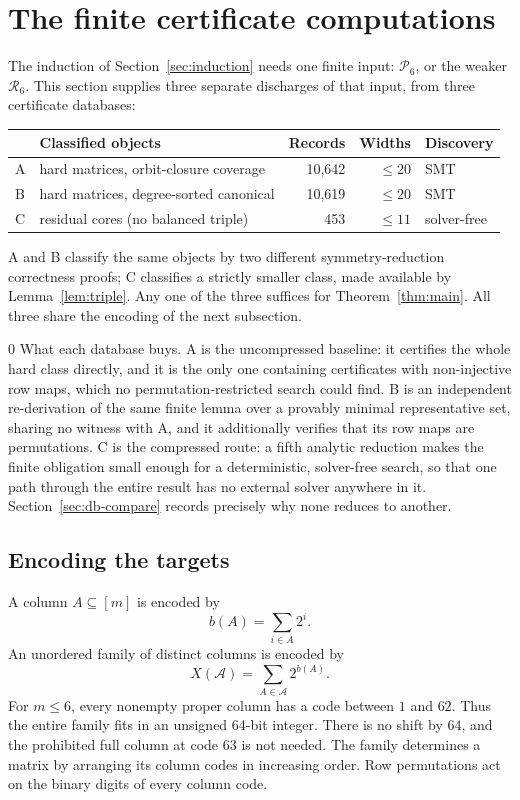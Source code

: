 \documentclass[11pt,letterpaper]{article}
\numberwithin{equation}{section}
\theoremstyle{definition}
\theoremstyle{remark}
\newcommand{\dbA}{\textsf{A}}
\newcommand{\dbB}{\textsf{B}}
\newcommand{\dbC}{\textsf{C}}
\begin{document}
\section{The finite certificate computations}
\label{sec:computation}
The induction of Section~\ref{sec:induction} needs one finite input:
$\mathcal P_6$, or the weaker $\mathcal R_6$. This section supplies three
separate discharges of that input, from three certificate databases:

\begin{center}
\begin{tabular}{llrrl}
\toprule
& Classified objects & Records & Widths & Discovery\\
\midrule
\dbA{} & hard matrices, orbit-closure coverage & 10,642 & $\le20$ & SMT\\
\dbB{} & hard matrices, degree-sorted canonical & 10,619 & $\le20$ & SMT\\
\dbC{} & residual cores (no balanced triple) & 453 & $\le11$ & solver-free\\
\bottomrule
\end{tabular}
\end{center}

\dbA{} and \dbB{} classify the same objects by two different
symmetry-reduction correctness proofs; \dbC{} classifies a strictly smaller
class, made available by Lemma~\ref{lem:triple}. Any one of the three
suffices for Theorem~\ref{thm:main}. All three share the encoding of the next
subsection.

\begin{variantbox}{0}
What each database buys. \dbA{} is the uncompressed baseline: it certifies the
whole hard class directly, and it is the only one containing certificates
with non-injective row maps, which no permutation-restricted search could
find. \dbB{} is an independent re-derivation of the same finite lemma over a
provably minimal representative set, sharing no witness with \dbA{}, and it
additionally verifies that its row maps are permutations. \dbC{} is the
compressed route: a fifth analytic reduction makes the finite obligation
small enough for a deterministic, solver-free search, so that one path
through the entire result has no external solver anywhere in it.
Section~\ref{sec:db-compare} records precisely why none reduces to another.
\end{variantbox}

\subsection{Encoding the targets}
A column $A\subseteq[m]$ is encoded by
\[
 b(A)=\sum_{i\in A}2^i.
\]
An unordered family of distinct columns is encoded by
\begin{equation}\label{eq:family-mask}
 X(\mathcal A)=\sum_{A\in\mathcal A}2^{b(A)}.
\end{equation}
For $m\le6$, every nonempty proper column has a code between $1$ and $62$.
Thus the entire family fits in an unsigned 64-bit integer. There is no
shift by $64$, and the prohibited full column at code $63$ is not needed.
The family determines a matrix by arranging its column codes in increasing
order. Row permutations act on the binary digits of every column code.
\end{document}
